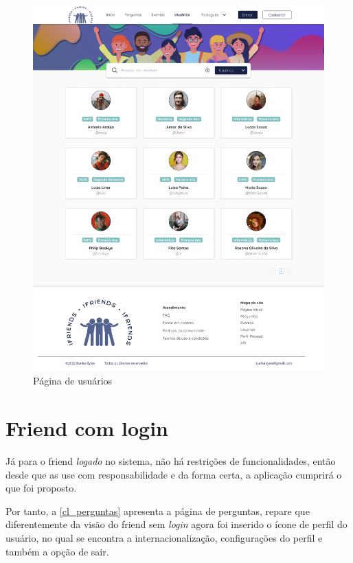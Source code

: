 \begin{figure}[htb]
\centering
\caption{\label{sl_usuarios} Página de usuários}
\includegraphics[width=1\textwidth]{anexos/Imagens_Prototipo/sem_login/usuarios.png}
\end{figure}
\FloatBarrier

\section{Friend com login}
Já para o \gls{friend} \textit{logado} no sistema, não há restrições de funcionalidades, então desde que as use com responsabilidade e da forma certa, a aplicação cumprirá o que foi proposto.

Por tanto, a \autoref{cl_perguntas} apresenta a página de perguntas, repare que diferentemente da visão do \gls{friend} sem \textit{login} agora foi inserido o ícone de perfil do usuário, no qual se encontra a internacionalização, configurações do perfil e também a opção de sair.

